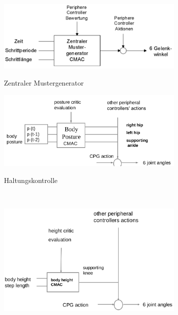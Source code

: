 \begin{figure}
	\begin{subfigure}{.5\textwidth}
		\centering
		\includegraphics[width=\textwidth]{figures/zentraler_mustergenerator.png}
		\label{ch:09:fig:zentraler-mustergenerator}
		\caption{Zentraler Mustergenerator}
	\end{subfigure}
	\begin{subfigure}{.5\textwidth}
		\centering
		\includegraphics[width=\textwidth]{figures/haltungskontrolle.png}
		\label{ch:09:fig:haltungskontrolle}
		\caption{Haltungskontrolle}
	\end{subfigure} \\
	\begin{subfigure}{.5\textwidth}
		\centering
		\includegraphics[width=\textwidth]{figures/koerperhoehe.png}

\end{subfigure}
\end{figure}
